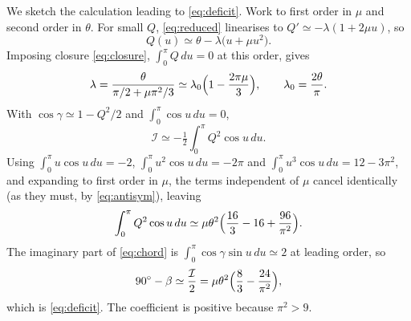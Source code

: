 \documentclass[aip,amsmath,amssymb,preprint,floatfix]{revtex4-2}
\begin{document}
We sketch the calculation leading to \eqref{eq:deficit}. Work to first order in $\mu$
and second order in $\theta$. For small $Q$, \eqref{eq:reduced} linearises to
$Q'\simeq-\lambda(1+2\mu u)$, so
\begin{equation}
Q(u) \simeq \theta - \lambda\bigl(u+\mu u^2\bigr).
\end{equation}
Imposing closure \eqref{eq:closure}, $\int_0^\pi Q\,du=0$ at this order, gives
\begin{equation}
\lambda = \frac{\theta}{\pi/2+\mu\pi^2/3}
        \simeq \lambda_0\Bigl(1-\frac{2\pi\mu}{3}\Bigr),\qquad
\lambda_0=\frac{2\theta}{\pi}.
\end{equation}
With $\cos\gamma\simeq1-Q^2/2$ and $\int_0^\pi\cos u\,du=0$,
\begin{equation}
\mathcal{I} \simeq -\tfrac12\int_0^\pi Q^2\cos u\,du .
\end{equation}
Using $\int_0^\pi u\cos u\,du=-2$, $\int_0^\pi u^2\cos u\,du=-2\pi$ and
$\int_0^\pi u^3\cos u\,du=12-3\pi^2$, and expanding to first order in $\mu$, the
terms independent of $\mu$ cancel identically (as they must, by \eqref{eq:antisym}),
leaving
\begin{equation}
\int_0^\pi Q^2\cos u\,du \simeq
 \mu\theta^2\Bigl(\frac{16}{3}-16+\frac{96}{\pi^2}\Bigr).
\end{equation}
The imaginary part of \eqref{eq:chord} is $\int_0^\pi\cos\gamma\sin u\,du\simeq2$ at
leading order, so
\begin{equation}
90^\circ-\beta \simeq \frac{\mathcal{I}}{2}
 = \mu\theta^2\Bigl(\frac{8}{3}-\frac{24}{\pi^2}\Bigr),
\end{equation}
which is \eqref{eq:deficit}. The coefficient is positive because $\pi^2>9$.


\end{document}
